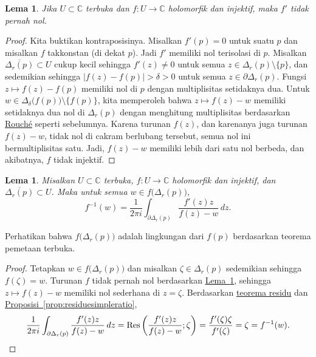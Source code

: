 \documentclass[12pt,openany]{book}
\newcommand{\sabs}[1]{\lvert {#1} \rvert}
\newcommand{\C}{{\mathbb{C}}}
\theoremstyle{plain}
\newtheorem{lemma}[thm]{Lema}
\theoremstyle{remark}
\theoremstyle{definition}
\theoremstyle{exercise}
\theoremstyle{example}
\newcommand{\propref}[1]{\hyperref[#1]{Proposisi~\ref*{#1}}}
\newcommand{\lemmaref}[1]{\hyperref[#1]{Lema~\ref*{#1}}}
\begin{document}
\begin{lemma} \label{lemma:dernonzero}
Jika $U \subset \C$ terbuka dan $f \colon U \to \C$ holomorfik dan injektif, maka
$f'$ tidak pernah nol.
\end{lemma}

\begin{proof}
Kita buktikan kontraposisinya.
Misalkan $f'(p) = 0$ untuk suatu $p$
dan misalkan $f$ takkonstan (di dekat $p$).
Jadi $f'$ memiliki
nol terisolasi di $p$.
Misalkan $\overline{\Delta_r(p)} \subset U$
cukup kecil sehingga $f'(z) \neq 0$ untuk semua $z \in \Delta_r(p) \setminus \{ p \}$,
dan sedemikian sehingga $\sabs{f(z)-f(p)} > \delta > 0$ untuk semua $z \in \partial
\Delta_r(p)$.
Fungsi $z \mapsto f(z) - f(p)$ memiliki nol di $p$ dengan multiplisitas setidaknya
dua.
Untuk $w \in \Delta_{\delta}\bigl(f(p)\bigr) \setminus \bigl\{ f(p) \bigr\}$,
kita memperoleh bahwa
$z \mapsto f(z)-w$ memiliki setidaknya dua nol di $\Delta_r(p)$ dengan menghitung multiplisitas berdasarkan
\hyperref[thm:rouche2]{Rouch\'e} seperti
sebelumnya.  Karena turunan $f(z)$, dan karenanya juga turunan $f(z)-w$, tidak nol di
cakram berlubang tersebut, semua nol ini bermultiplisitas satu.  Jadi, $f(z)-w$
memiliki lebih dari satu nol berbeda, dan akibatnya, $f$ tidak injektif.
\end{proof}

\begin{lemma} \label{lemma:inverseasintegral}
Misalkan $U \subset \C$ terbuka,
$f \colon U \to \C$ holomorfik dan injektif, dan
$\overline{\Delta_r(p)} \subset U$.  Maka untuk semua $w \in
f\bigl(\Delta_r(p)\bigr)$,
\begin{equation*}
f^{-1}(w) = \frac{1}{2\pi i} \int_{\partial \Delta_r(p)}
\frac{f'(z)z}{f(z)-w} \, dz .
\end{equation*}
\end{lemma}

Perhatikan bahwa $f\bigl(\Delta_r(p)\bigr)$ adalah lingkungan dari $f(p)$
berdasarkan teorema pemetaan terbuka.

\begin{proof}
Tetapkan $w \in f\bigl(\Delta_r(p)\bigr)$ dan misalkan $\zeta \in \Delta_r(p)$
sedemikian sehingga $f(\zeta) = w$.
Turunan $f$ tidak pernah nol berdasarkan \lemmaref{lemma:dernonzero},
sehingga $z \mapsto f(z)-w$ memiliki nol
sederhana di $z=\zeta$.  Berdasarkan \hyperref[thm:residue]{teorema residu} dan
\propref{prop:residuesimpleratio},
\begin{equation*}
\frac{1}{2\pi i} \int_{\partial \Delta_r(p)}
\frac{f'(z)z}{f(z)-w} \, dz
=
\operatorname{Res}\left(\frac{f'(z)z}{f(z)-w};\zeta\right)
=
\frac{f'(\zeta)\zeta}{f'(\zeta)} = \zeta = f^{-1}(w) .
\qedhere
\end{equation*}
\end{proof}
\end{document}
